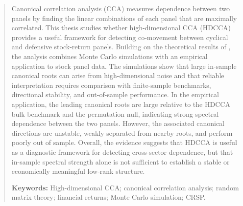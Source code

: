 \documentclass[12pt]{report} %
\begin{document}
\newpage %
\thispagestyle{plain}
\mbox{}

\renewcommand\abstractname{\large\bfseries\filcenter\uppercase{Summary}}
\begin{abstract}
\thispagestyle{plain}
	
	Canonical correlation analysis (CCA) measures dependence between two panels by finding the linear combinations of each 
	panel that are maximally correlated. This thesis studies whether high-dimensional CCA (HDCCA) provides a useful 
	framework for detecting co-movement between cyclical and defensive stock-return panels. Building on the theoretical 
	results of \citet{BykhovskayaGorin2023}, the analysis combines Monte Carlo simulations with an empirical application 
	to stock panel data. The simulations show that large in-sample canonical roots can arise from high-dimensional noise and 
	that reliable interpretation requires comparison with finite-sample benchmarks, directional stability, and out-of-sample 
	performance. In the empirical application, the leading canonical roots are large relative to the HDCCA bulk benchmark and 
	the permutation null, indicating strong spectral dependence between the two panels. However, the associated canonical 
	directions are unstable, weakly separated from nearby roots, and perform poorly out of sample. Overall, the evidence 
	suggests that HDCCA is useful as a diagnostic framework for detecting cross-sector dependence, but that in-sample 
	spectral strength alone is not sufficient to establish a stable or economically meaningful low-rank structure.
	
	\textbf{Keywords:} High-dimensional CCA; canonical correlation analysis; random matrix theory; financial returns; Monte Carlo simulation; CRSP.

	\vfill
\end{abstract}
\end{document}
